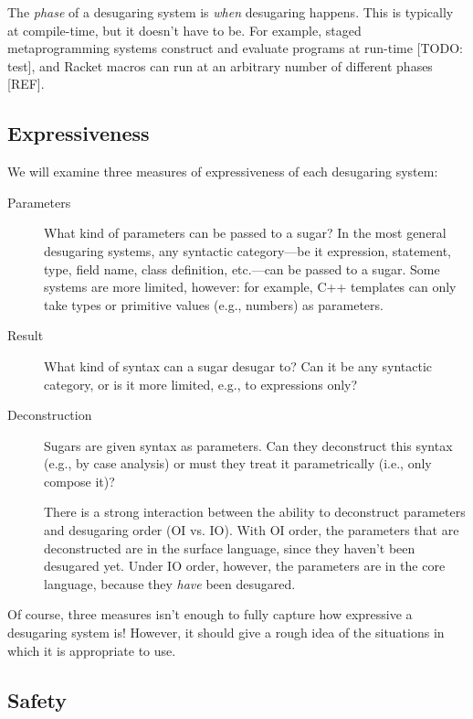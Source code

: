 The \emph{phase} of a desugaring system is \emph{when} desugaring
happens. This is typically at compile-time, but it doesn't have to be.
For example, staged metaprogramming systems construct and evaluate
programs at run-time [TODO: test], and Racket macros can run at an
arbitrary number of different phases [REF].

\subsection{Expressiveness}

We will examine three measures of expressiveness of each desugaring
system:
\begin{description}
\item[Parameters] What kind of parameters can be passed to a sugar? In
  the most general desugaring systems, any syntactic category---be it
  expression, statement, type, field name, class definition,
  etc.---can be passed to a sugar. Some systems are more limited,
  however: for example, C++ templates can only take types or primitive
  values (e.g., numbers) as parameters.
\item[Result] What kind of syntax can a sugar desugar to? Can it be
  any syntactic category, or is it more limited, e.g., to expressions
  only?
\item[Deconstruction] Sugars are given syntax as parameters. Can they
  deconstruct this syntax (e.g., by case analysis) or must
  they treat it parametrically (i.e., only compose it)?

  There is a strong interaction between the ability to deconstruct
  parameters and desugaring order (OI vs. IO). With OI order, the
  parameters that are deconstructed are in the surface language, since
  they haven't been desugared yet. Under IO order, however, the
  parameters are in the core language, because they \emph{have} been
  desugared.
\end{description}
Of course, three measures isn't enough to fully capture how expressive
a desugaring system is! However, it should give a rough idea of the
situations in which it is appropriate to use.


\subsection{Safety}\label{sec:taxonomy-safety}

